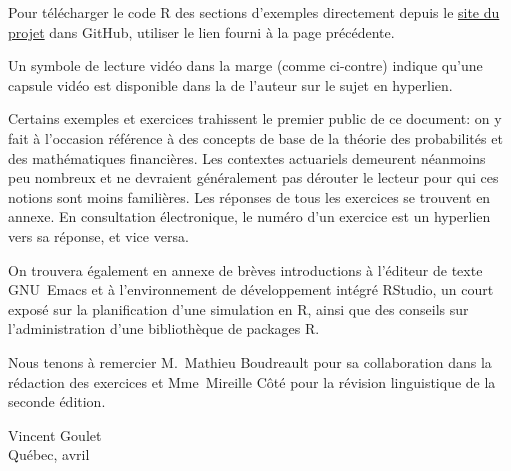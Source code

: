 Pour télécharger le code R des sections d'exemples directement depuis
le \href{https://vigou3.github.io/introduction-programmation-r/}{site
  du projet} dans GitHub, utiliser le lien fourni à la page
précédente.

Un symbole de lecture vidéo dans la marge (comme ci-contre) indique
qu'une capsule vidéo est disponible dans la %
de l'auteur sur le sujet en hyperlien.

Certains exemples et exercices trahissent le premier public de ce
document: on y fait à l'occasion référence à des concepts de base de
la théorie des probabilités et des mathématiques financières. Les
contextes actuariels demeurent néanmoins peu nombreux et ne devraient
généralement pas dérouter le lecteur pour qui ces notions sont moins
familières. Les réponses de tous les exercices se trouvent en annexe.
En consultation électronique, le numéro d'un exercice est un hyperlien
vers sa réponse, et vice versa.

On trouvera également en annexe de brèves introductions à l'éditeur de
texte GNU~Emacs et à l'environnement de développement intégré RStudio,
un court exposé sur la planification d'une simulation en R, ainsi que
des conseils sur l'administration d'une bibliothèque de packages R.

Nous tenons à remercier M.~Mathieu Boudreault pour sa collaboration
dans la rédaction des exercices et Mme~Mireille Côté pour la révision
linguistique de la seconde édition.

\begin{flushright}
  Vincent Goulet \\
  Québec, avril \year
\end{flushright}


